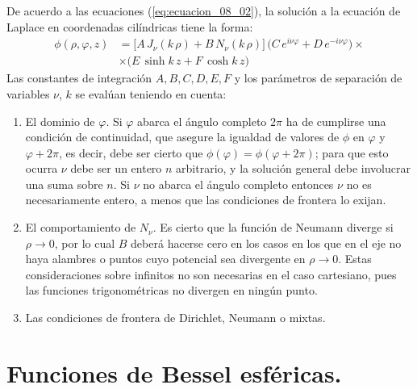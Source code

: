 De acuerdo a las ecuaciones (\ref{eq:ecuacion_08_02}), la solución a la ecuación de Laplace en coordenadas cilíndricas tiene la forma:
\begin{align*}
\phi (\rho, \varphi, z) &= \bigg[ A \, J_{\nu} (k \, \rho) + B \, N_{\nu} (k \, \rho) \bigg] \, \big( C \, e^{i \nu \varphi} + D \, e^{-i \nu \varphi} \big) \times \\[0.5em]
&\times \big( E \, \sinh k \, z + F \,  \cosh k \, z \big)
\end{align*}
Las constantes de integración $A, B, C, D, E, F$ y los parámetros de separación de variables $\nu$, $k$ se evalúan teniendo en cuenta:
\begin{enumerate}[label=\textbf{\Alph*})]
\item El dominio de $\varphi$. Si $\varphi$ abarca el ángulo completo $2 \pi$ ha de cumplirse una condición de continuidad, que asegure la igualdad de valores de $\phi$ en $\varphi$ y $\varphi + 2 \pi$, es decir, debe ser cierto que $\phi (\varphi) = \phi (\varphi + 2 \pi)$; para que esto ocurra $\nu$ debe ser un entero $n$ arbitrario, y la solución general debe involucrar una suma sobre $n$. Si $\nu$ no abarca el ángulo completo entonces $\nu$ no es necesariamente entero, a menos que las condiciones de frontera lo exijan.
\item El comportamiento de $N_{\nu}$. Es cierto que la función de Neumann diverge si $\rho \to 0$, por lo cual $B$ deberá hacerse cero en los casos en los que en el eje no haya alambres o puntos cuyo potencial sea divergente en $\rho \to 0$. Estas consideraciones sobre infinitos no son necesarias en el caso cartesiano, pues las funciones trigonométricas no divergen en ningún punto.
\item Las condiciones de frontera de Dirichlet, Neumann o mixtas.
\end{enumerate}

\section{Funciones de Bessel esféricas.}

